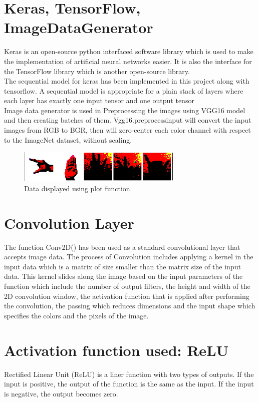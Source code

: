 \section{Keras, TensorFlow, ImageDataGenerator}
Keras is an open-source python interfaced software library which is used to make the implementation of artificial neural networks easier. It is also the interface for the TensorFlow library which is another open-source library. \\
The sequential model for keras has been implemented in this project along with tensorflow. A sequential model is appropriate for a plain stack of layers where each layer has exactly one input tensor and one output tensor\\
Image data generator is used in Preprocessing the images using VGG16 model and then creating batches of them. Vgg16.preprocessinput will convert the input images from RGB to BGR, then will zero-center each color channel with respect to the ImageNet dataset, without scaling.

\begin{figure} [h!]
\centering
\includegraphics[width=0.7\textwidth]{Plotted data.jpeg}
\caption{\label{fig:frog}Data displayed using plot function}
\end{figure}

\section{Convolution Layer}
The function Conv2D() has been used as a standard convolutional layer that accepts image data. The process of Convolution includes applying a kernel in the input data which is a matrix of size smaller than the matrix size of the input data. This kernel slides along the image based on the input parameters of the function which include the number of output filters, the height and width of the 2D convolution window, the activation function that is applied after performing the convolution, the passing which reduces dimensions and the input shape which specifies the colors and the pixels of the image.

\section{Activation function used: ReLU}
Rectified Linear Unit (ReLU) is a liner function with two types of outputs. If the input is positive, the output of the function is the same as the input. If the input is negative, the output becomes zero.

